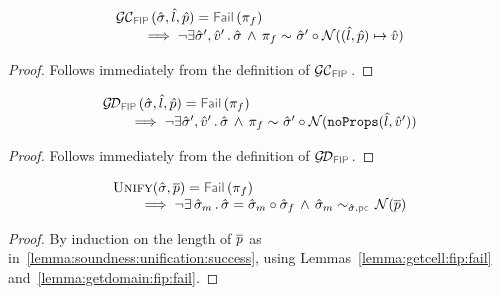  \begin{lemma}\label{lemma:getcell:fip:fail}
$$
\begin{array}{l}
\GetCellV{\sstate, \sloc, \sexprp} = \fail{\pc_f} \\ \quad \quad
    \implies 
        \neg \exists \sstate', \sexprv' \, . \, \stateequivrel{\sstate \, \wedge \, \pc_f}{\sstate' \statecompose \normaliser((\sloc, \sexprp) \pointsto \sexprv)}{}
\end{array}
$$
\end{lemma}
\begin{proof}
Follows immediately from the definition of $\GetCellVFun$. 
\end{proof}

\begin{lemma}\label{lemma:getdomain:fip:fail}
$$
\begin{array}{l}
\GetDomainV{\sstate, \sloc, \sexprp} = \fail{\pc_f} \\ \quad \quad 
    \implies 
         \neg \exists \sstate', \sexprv' \, . \, \stateequivrel{\sstate \, \wedge \, \pc_f}{\sstate' \statecompose \normaliser(\emptyfields{\sloc}{\sexprv'})}{}
\end{array}
$$
\end{lemma}
 \begin{proof}
Follows immediately from the definition of $\GetDomainVFun$. 
\end{proof}
 
 
 \begin{lemma}\label{lemma:soundness:unification:failure}
$$
\begin{array}{l}
\unificationfun(\sstate, \jvec{\spass}) = \fail{\pc_f} \\ \quad \quad
  \implies 
   \neg \exists \, \sstate_m \, . \, 
   \sstate = \sstate_m \statecompose \sstate_f 
   \, \wedge \, 
    \stateequivrel{\sstate_m}{\normaliser(\jvec{\spass})}{\sstate.\pcsel}
\end{array}
$$
\end{lemma}
  \begin{proof}
By induction on the length of $\overline{p}$ as in~\ref{lemma:soundness:unification:success}, using 
Lemmas~\ref{lemma:getcell:fip:fail} and~\ref{lemma:getdomain:fip:fail}. 
\end{proof}
 
